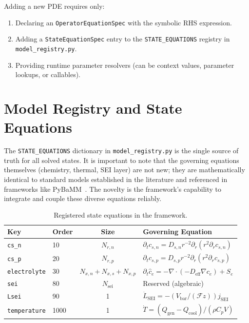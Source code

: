 Adding a new PDE requires only:
\begin{enumerate}
  \item Declaring an \texttt{OperatorEquationSpec} with the symbolic RHS expression.
  \item Adding a \texttt{StateEquationSpec} entry to the \texttt{STATE\_EQUATIONS} registry in \texttt{model\_registry.py}.
  \item Providing runtime parameter resolvers (can be context values, parameter lookups, or callables).
\end{enumerate}

\section{Model Registry and State Equations}
\label{sec:model_registry}

The \texttt{STATE\_EQUATIONS} dictionary in \texttt{model\_registry.py} is the single source of truth for all solved states. It is important to note that the governing equations themselves (chemistry, thermal, SEI layer) are not new; they are mathematically identical to standard models established in the literature and referenced in frameworks like PyBaMM~\cite{Chen2020}. The novelty is the framework's capability to integrate and couple these diverse equations reliably.

\begin{table}[H]
\centering
\caption{Registered state equations in the \VIBE{} framework.}
\label{tab:state_equations}
\small
\begin{tabular}{llcp{5.5cm}}
\toprule
\textbf{Key} & \textbf{Order} & \textbf{Size} & \textbf{Governing Equation} \\
\midrule
\texttt{cs\_n} & 10 & $N_{r,n}$ & $\partial_t c_{s,n} = D_{s,n} r^{-2}\partial_r(r^2 \partial_r c_{s,n})$ \\
\texttt{cs\_p} & 20 & $N_{r,p}$ & $\partial_t c_{s,p} = D_{s,p} r^{-2}\partial_r(r^2 \partial_r c_{s,p})$ \\
\texttt{electrolyte} & 30 & $N_{x,n}+N_{x,s}+N_{x,p}$ & $\partial_t \hat{c}_e = -\nabla\cdot(-D_\text{eff}\nabla c_e) + S_e$ \\
\texttt{sei} & 80 & $N_\text{sei}$ & Reserved (algebraic) \\
\texttt{Lsei} & 90 & 1 & $\dot{L}_\text{SEI} = -(V_\text{bar}/(\mathcal{F} z)) j_\text{SEI}$ \\
\texttt{temperature} & 1000 & 1 & $\dot{T} = (Q_\text{gen} - Q_\text{cool}) / (\rho C_p V)$ \\
\bottomrule
\end{tabular}
\end{table}

